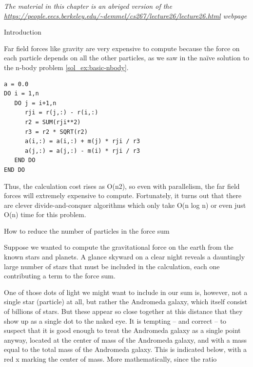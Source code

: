 
\emph{The material in this chapter is an abriged version of the
  \url{https://people.eecs.berkeley.edu/~demmel/cs267/lecture26/lecture26.html} webpage}

 {Introduction}
\label{sec:bh-intro}

Far field forces like gravity are very expensive to compute because the force on
each particle depends on all the other particles, as we saw in the naïve
solution to the n-body problem \ref{sol_ex:basic-nbody}.

\begin{verbatim}
a = 0.0
DO i = 1,n
   DO j = i+1,n
      rji = r(j,:) - r(i,:)
      r2 = SUM(rji**2)
      r3 = r2 * SQRT(r2)
      a(i,:) = a(i,:) + m(j) * rji / r3
      a(j,:) = a(j,:) - m(i) * rji / r3
   END DO
END DO
\end{verbatim}

Thus, the calculation cost rises as O(n2), so even with parallelism, the far
field forces will extremely expensive to compute. Fortunately, it turns out that
there are clever divide-and-conquer algorithms which only take O(n log n) or
even just O(n) time for this problem.

 {How to reduce the number of particles in the force sum}
\label{sec:bh-reduce-number-particles}

Suppose we wanted to compute the gravitational force on the earth from the known
stars and planets. A glance skyward on a clear night reveals a dauntingly large
number of stars that must be included in the calculation, each one contributing
a term to the force sum.

One of those dots of light we might want to include in our sum is, however, not
a single star (particle) at all, but rather the Andromeda galaxy, which itself
consist of billions of stars. But these appear so close together at this
distance that they show up as a single dot to the naked eye. It is tempting --
and correct -- to suspect that it is good enough to treat the Andromeda galaxy
as a single point anyway, located at the center of mass of the Andromeda galaxy,
and with a mass equal to the total mass of the Andromeda galaxy. This is
indicated below, with a red x marking the center of mass. More mathematically,
since the ratio

